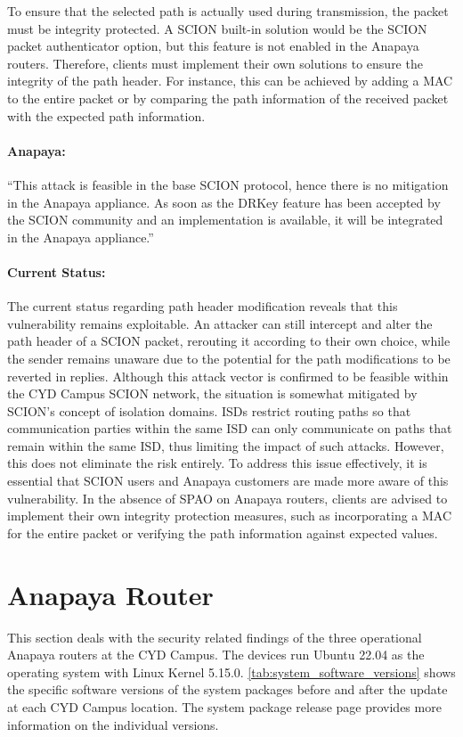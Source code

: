To ensure that the selected path is actually used during transmission, the packet must be integrity protected.
A SCION built-in solution would be the SCION packet authenticator option, but this feature is not enabled in the Anapaya routers.
Therefore, clients must implement their own solutions to ensure the integrity of the path header.
For instance, this can be achieved by adding a MAC to the entire packet or by comparing the path information of the received packet with the expected path information.

\begin{boxH}
\paragraph{Anapaya:}
``This attack is feasible in the base SCION protocol, hence there is no mitigation in the Anapaya appliance. As soon as the DRKey feature has been accepted by the SCION community and an implementation is available, it will be integrated in the Anapaya appliance.''
\end{boxH}

\paragraph{Current Status:}
The current status regarding path header modification reveals that this vulnerability remains exploitable.
An attacker can still intercept and alter the path header of a SCION packet, rerouting it according to their own choice, while the sender remains unaware due to the potential for the path modifications to be reverted in replies.
Although this attack vector is confirmed to be feasible within the CYD Campus SCION network, the situation is somewhat mitigated by SCION's concept of isolation domains.
ISDs restrict routing paths so that communication parties within the same ISD can only communicate on paths that remain within the same ISD, thus limiting the impact of such attacks.
However, this does not eliminate the risk entirely.
To address this issue effectively, it is essential that SCION users and Anapaya customers are made more aware of this vulnerability.
In the absence of SPAO on Anapaya routers, clients are advised to implement their own integrity protection measures, such as incorporating a MAC for the entire packet or verifying the path information against expected values.

\section{Anapaya Router}
\label{sec:findings:anapaya-router}
This section deals with the security related findings of the three operational Anapaya routers at the CYD Campus.
The devices run Ubuntu 22.04 as the operating system with Linux Kernel 5.15.0.
\cref{tab:system_software_versions} shows the specific software versions of the system packages before and after the update at each CYD Campus location.
The system package release page \cite{anapayaSystemPackage} provides more information on the individual versions.

